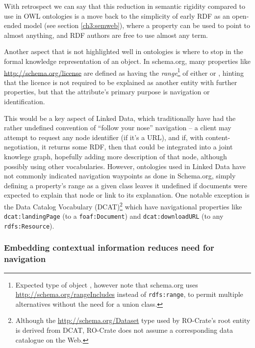 With retrospect we can say that this reduction in semantic rigidity compared to use in OWL ontologies is a move back to the simplicity of early RDF as an open-ended model (see section \vref{ch3:semweb}), where a property can be used to point to almost anything, and RDF authors are free to use almost any term.

Another aspect that is not highlighted well in ontologies is where to stop in the formal knowledge representation of an object.
In schema.org, many properties like \url{http://schema.org/license} are defined as having the \emph{range}\footnote{Expected type of object \cite{w3-rdf-schema}, however note that schema.org uses \url{http://schema.org/rangeIncludes} instead of \texttt{rdfs:range}, to permit multiple alternatives without the need for a union class.} of either  or , hinting that the licence is not required to be explained as another entity with further properties, but that the attribute's primary purpose is navigation or identification. 

This would be a key aspect of Linked Data, which traditionally have had the rather undefined convention of ``follow your nose'' navigation -- a client may attempt to request any node identifier (if it's a URL), and if, with content-negotiation, it returns some RDF, then that could be integrated into a joint knowlege graph, hopefully adding more description of that node, although possibly using other vocabularies.
However, ontologies used in Linked Data have not commonly indicated navigation waypoints as done in Schema.org, simply defining a property's range as a given class leaves it undefined if documents were expected to explain that node or link to its explanation. One notable exception is the Data Catalog Vocabulary (DCAT)\footnote{Although the \url{http://schema.org/Dataset} type used by RO-Crate's root entity is derived from DCAT, RO-Crate does not assume a corresponding data catalogue on the Web.} \cite{DCAT2 2020} which have navigational properties like \texttt{dcat:landingPage} (to a \texttt{foaf:Document}) and \texttt{dcat:downloadURL} (to any \texttt{rdfs:Resource}).


\subsubsection{Embedding contextual information reduces need for navigation}

